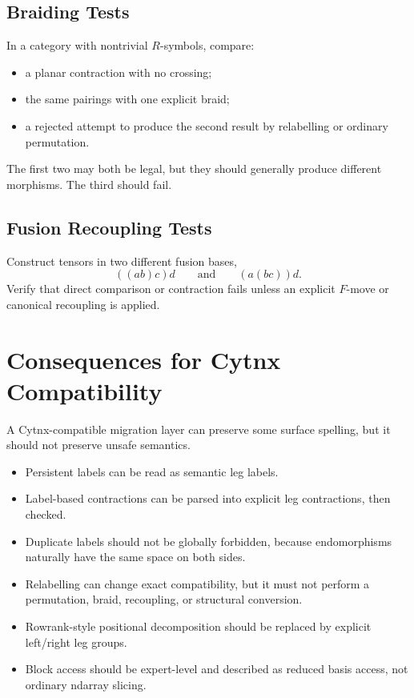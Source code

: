 \documentclass[11pt]{article}
\begin{document}
\subsection{Braiding Tests}

In a category with nontrivial \(R\)-symbols, compare:

\begin{itemize}[nosep]
  \item a planar contraction with no crossing;
  \item the same pairings with one explicit braid;
  \item a rejected attempt to produce the second result by relabelling
        or ordinary permutation.
\end{itemize}

The first two may both be legal, but they should generally produce
different morphisms.  The third should fail.

\subsection{Fusion Recoupling Tests}

Construct tensors in two different fusion bases,
\[
  ((a b)c)d
  \qquad\text{and}\qquad
  (a(b c))d.
\]
Verify that direct comparison or contraction fails unless an explicit
\(F\)-move or canonical recoupling is applied.

\section{Consequences for Cytnx Compatibility}

A Cytnx-compatible migration layer can preserve some surface spelling,
but it should not preserve unsafe semantics.

\begin{itemize}
  \item Persistent labels can be read as semantic leg labels.
  \item Label-based contractions can be parsed into explicit leg
        contractions, then checked.
  \item Duplicate labels should not be globally forbidden, because
        endomorphisms naturally have the same space on both sides.
  \item Relabelling can change exact compatibility, but it must not
        perform a permutation, braid, recoupling, or structural
        conversion.
  \item Rowrank-style positional decomposition should be replaced by
        explicit left/right leg groups.
  \item Block access should be expert-level and described as reduced
        basis access, not ordinary ndarray slicing.
\end{itemize}
\end{document}
